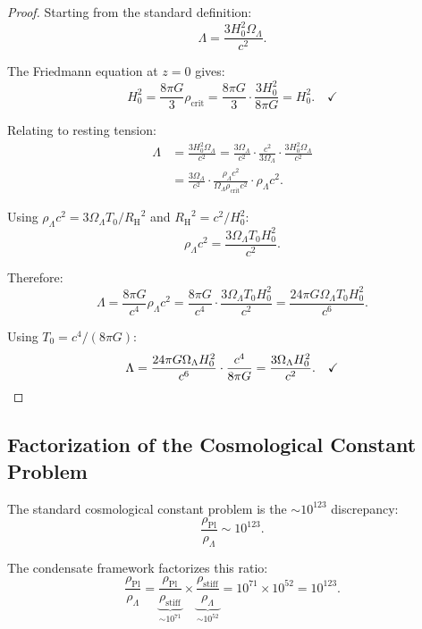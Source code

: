 \documentclass[11pt,a4paper]{article}
\newcommand{\rhocrit}{\ensuremath{\rho_{\mathrm{crit}}}}
\newcommand{\rhostiff}{\ensuremath{\rho_{\mathrm{stiff}}}}
\newcommand{\rhoPl}{\ensuremath{\rho_{\mathrm{Pl}}}}
\newcommand{\Tzero}{\ensuremath{T_0}}
\newcommand{\RH}{\ensuremath{R_{\mathrm{H}}}}
\newcommand{\OmegaLam}{\ensuremath{\Omega_\Lambda}}
\theoremstyle{definition}
\theoremstyle{remark}
\begin{document}
\begin{proof}
Starting from the standard definition:
\begin{equation}
\Lambda = \frac{3H_0^2 \OmegaLam}{c^2}.
\end{equation}

The Friedmann equation at $z = 0$ gives:
\begin{equation}
H_0^2 = \frac{8\pi G}{3}\rhocrit = \frac{8\pi G}{3} \cdot \frac{3H_0^2}{8\pi G} = H_0^2. \quad \checkmark
\end{equation}

Relating to resting tension:
\begin{align}
\Lambda &= \frac{3H_0^2 \OmegaLam}{c^2} = \frac{3\OmegaLam}{c^2} \cdot \frac{c^2}{3\OmegaLam} \cdot \frac{3H_0^2 \OmegaLam}{c^2} \\
&= \frac{3\OmegaLam}{c^2} \cdot \frac{\rho_\Lambda c^2}{\OmegaLam \rhocrit c^2} \cdot \rho_\Lambda c^2.
\end{align}

Using $\rho_\Lambda c^2 = 3\OmegaLam \Tzero/\RH^2$ and $\RH^2 = c^2/H_0^2$:
\begin{equation}
\rho_\Lambda c^2 = \frac{3\OmegaLam \Tzero H_0^2}{c^2}.
\end{equation}

Therefore:
\begin{equation}
\Lambda = \frac{8\pi G}{c^4}\rho_\Lambda c^2 = \frac{8\pi G}{c^4} \cdot \frac{3\OmegaLam \Tzero H_0^2}{c^2} = \frac{24\pi G \OmegaLam \Tzero H_0^2}{c^6}.
\end{equation}

Using $\Tzero = c^4/(8\pi G)$:
\begin{equation}
\Lambda = \frac{24\pi G \OmegaLam H_0^2}{c^6} \cdot \frac{c^4}{8\pi G} = \frac{3\OmegaLam H_0^2}{c^2}. \quad \checkmark \qedhere
\end{equation}
\end{proof}

\subsection{Factorization of the Cosmological Constant Problem}
\label{sec:cc_problem}

The standard cosmological constant problem is the $\sim 10^{123}$ discrepancy:
\begin{equation}
\frac{\rhoPl}{\rho_\Lambda} \sim 10^{123}.
\end{equation}

The condensate framework factorizes this ratio:
\begin{equation}
\label{eq:cc_factorization}
\boxed{\frac{\rhoPl}{\rho_\Lambda} = \underbrace{\frac{\rhoPl}{\rhostiff}}_{\sim 10^{71}} \times \underbrace{\frac{\rhostiff}{\rho_\Lambda}}_{\sim 10^{52}} = 10^{71} \times 10^{52} = 10^{123}.}
\end{equation}
\end{document}
